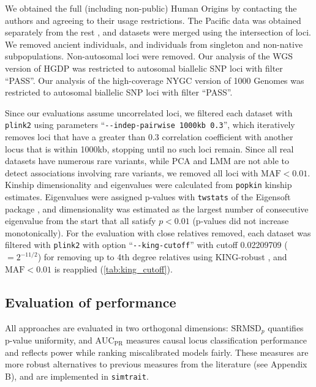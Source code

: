 \documentclass[11pt]{article}
\newcommand{\rmsd}{\text{SRMSD}_p}
\newcommand{\auc}{\text{AUC}_\text{PR}}
\begin{document}
We obtained the full (including non-public) Human Origins by contacting the authors and agreeing to their usage restrictions.
The Pacific data \citep{skoglund_genomic_2016} was obtained separately from the rest \citep{lazaridis_ancient_2014,lazaridis_genomic_2016}, and datasets were merged using the intersection of loci.
We removed ancient individuals, and individuals from singleton and non-native subpopulations.
Non-autosomal loci were removed.
Our analysis of the WGS version of HGDP \citep{bergstrom_insights_2020} was restricted to autosomal biallelic SNP loci with filter ``PASS''.
Our analysis of the high-coverage NYGC version of 1000 Genomes \citep{fairley_international_2020} was restricted to autosomal biallelic SNP loci with filter ``PASS''.

Since our evaluations assume uncorrelated loci, we filtered each dataset with \texttt{plink2} using parameters ``\texttt{-{}-indep-pairwise 1000kb 0.3}'', which iteratively removes loci that have a greater than 0.3 correlation coefficient with another locus that is within 1000kb, stopping until no such loci remain.
Since all real datasets have numerous rare variants, while PCA and LMM are not able to detect associations involving rare variants, we removed all loci with $\text{MAF} < 0.01$.
Kinship dimensionality and eigenvalues were calculated from \texttt{popkin} kinship estimates.
Eigenvalues were assigned p-values with \texttt{twstats} of the Eigensoft package \citep{patterson_population_2006}, and dimensionality was estimated as the largest number of consecutive eigenvalue from the start that all satisfy $p < 0.01$ (p-values did not increase monotonically).
For the evaluation with close relatives removed, each dataset was filtered with \texttt{plink2} with option ``\texttt{-{}-king-cutoff}'' with cutoff 0.02209709 ($= 2^{-11/2}$) for removing up to 4th degree relatives using KING-robust \citep{manichaikul_robust_2010}, and $\text{MAF} < 0.01$ is reapplied (\cref{tab:king_cutoff}).

\subsection{Evaluation of performance}

All approaches are evaluated in two orthogonal dimensions: $\rmsd$ quantifies p-value uniformity, and $\auc$ measures causal locus classification performance and reflects power while ranking miscalibrated models fairly.
These measures are more robust alternatives to previous measures from the literature (see Appendix B), and are implemented in \texttt{simtrait}.
\end{document}
